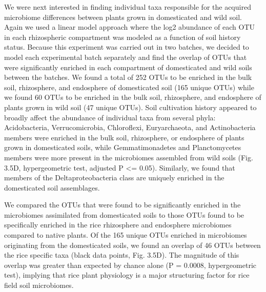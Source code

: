 We were next interested in finding individual taxa responsible for the acquired microbiome differences between plants grown in domesticated and wild soil. Again we used a linear model approach where the log2 abundance of each OTU in each rhizospheric compartment was modeled as a function of soil history status. Because this experiment was carried out in two batches, we decided to model each experimental batch separately and find the overlap of OTUs that were significantly enriched in each compartment of domesticated and wild soils between the batches. We found a total of 252 OTUs to be enriched in the bulk soil, rhizosphere, and endosphere of domesticated soil (165 unique OTUs) while we found 60 OTUs to be enriched in the bulk soil, rhizosphere, and endosphere of plants grown in wild soil (47 unique OTUs). Soil cultivation history appeared to broadly affect the abundance of individual taxa from several phyla: Acidobacteria, Verrucomicrobia, Chloroflexi, Euryarchaeota, and Actinobacteria members were enriched in the bulk soil, rhizosphere, or endosphere of plants grown in domesticated soils, while Gemmatimonadetes and Planctomycetes members were more present in the microbiomes assembled from wild soils (Fig. 3.5D, hypergeometric test, adjusted P <= 0.05). Similarly, we found that members of the Deltaproteobacteria class are uniquely enriched in the domesticated soil assemblages. 

We compared the OTUs that were found to be significantly enriched in the microbiomes assimilated from domesticated soils to those OTUs found to be specifically enriched in the rice rhizosphere and endosphere microbiomes compared to native plants. Of the 165 unique OTUs enriched in microbiomes originating from the domesticated soils, we found an overlap of 46 OTUs between the rice specific taxa (black data points, Fig. 3.5D). The magnitude of this overlap was greater than expected by chance alone (P = 0.0008, hypergeometric test), implying that rice plant physiology is a major structuring factor for rice field soil microbiomes.

